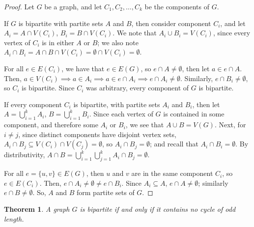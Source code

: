 \documentclass[a4paper,12pt]{article}
\newtheorem{theorem}{Theorem}
\begin{document}
\begin{proof}
Let $G$ be a graph, and let $C_1, C_2, \dots, C_k$ be the components of $G$.

If $G$ is bipartite with partite sets $A$ and $B$, then consider component
$C_i$, and let $A_i = A \cap V(C_i)$, $B_i = B \cap V(C_i)$. We note that
$A_i \cup B_i = V(C_i)$, since every vertex of $C_i$ is in either $A$ or $B$;
we also note $A_i \cap B_i = A \cap B \cap V(C_i) = \emptyset \cap V(C_i) = \emptyset$.

For all $e \in E(C_i)$, we have that $e \in E(G)$, so $e \cap A \neq \emptyset$,
then let $a \in e \cap A$. Then, $a \in V(C_i) \implies a \in A_i \implies
a \in e \cap A_i \implies e \cap A_i \neq \emptyset$. Similarly,
$e \cap B_i \neq \emptyset$, so $C_i$ is bipartite. Since $C_i$ was arbitrary,
every component of $G$ is bipartite.

If every component $C_i$ is bipartite, with partite sets $A_i$ and $B_i$, then
let $A = \bigcup_{i=1}^{k} A_i$, $B = \bigcup_{i=1}^{k} B_i$. Since each vertex
of $G$ is contained in some component, and therefore some $A_i$ or $B_i$, we
see that $A \cup B = V(G)$. Next, for $i \neq j$, since distinct components
have disjoint vertex sets, $A_i \cap B_j \subseteq V(C_i) \cap V(C_j) = \emptyset$,
so $A_i \cap B_j = \emptyset$; and recall that $A_i \cap B_i = \emptyset$.
By distributivity,
$A \cap B = \bigcup_{i=1}^{k} \bigcup_{j=1}^{k} A_i \cap B_j = \emptyset$.

For all $e = \{u, v\} \in E(G)$, then $u$ and $v$ are in the same component
$C_i$, so $e \in E(C_i)$. Then, $e \cap A_i \neq \emptyset \neq e \cap B_i$.
Since $A_i \subseteq A$, $e \cap A \neq \emptyset$; similarly
$e \cap B \neq \emptyset$. So, $A$ and $B$ form partite sets of $G$.
\end{proof}

\begin{theorem}
A graph $G$ is bipartite if and only if it contains no cycle of odd length.
\end{theorem}
\end{document}
